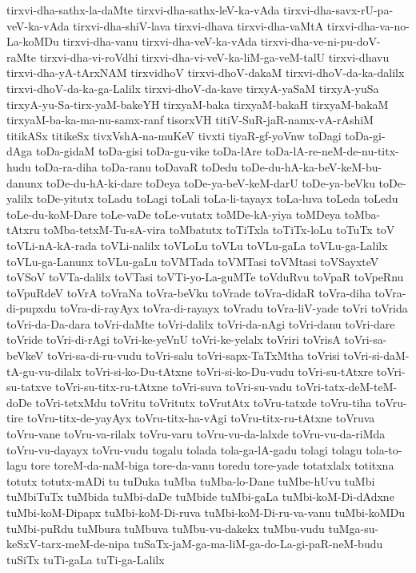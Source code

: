 {tirxvi-dha-sathx-la-daMte
tirxvi-dha-sathx-leV-ka-vAda
tirxvi-dha-savx-rU-pa-veV-ka-vAda
tirxvi-dha-shiV-lava
tirxvi-dhava
tirxvi-dha-vaMtA
tirxvi-dha-va-no-La-koMDu
tirxvi-dha-vanu
tirxvi-dha-veV-ka-vAda
tirxvi-dha-ve-ni-pu-doV-raMte
tirxvi-dha-vi-roVdhi
tirxvi-dha-vi-veV-ka-liM-ga-veM-talU
tirxvi-dhavu
tirxvi-dha-yA-tArxNAM
tirxvidhoV
tirxvi-dhoV-dakaM
tirxvi-dhoV-da-ka-dalilx
tirxvi-dhoV-da-ka-ga-Lalilx
tirxvi-dhoV-da-kave
tirxyA-yaSaM
tirxyA-yuSa
tirxyA-yu-Sa-tirx-yaM-bakeYH
tirxyaM-baka
tirxyaM-bakaH
tirxyaM-bakaM
tirxyaM-ba-ka-ma-nu-samx-ranf
tisorxVH
titiV-SuR-jaR-namx-vA-rAshiM
titikASx
titikeSx
tivxVshA-na-muKeV
tivxti
tiyaR-gf-yoVnw
toDagi
toDa-gi-dAga
toDa-gidaM
toDa-gisi
toDa-gu-vike
toDa-lAre
toDa-lA-re-neM-de-nu-titx-hudu
toDa-ra-diha
toDa-ranu
toDavaR
toDedu
toDe-du-hA-ka-beV-keM-bu-danunx
toDe-du-hA-ki-dare
toDeya
toDe-ya-beV-keM-darU
toDe-ya-beVku
toDe-yalilx
toDe-yitutx
toLadu
toLagi
toLali
toLa-li-tayayx
toLa-luva
toLeda
toLedu
toLe-du-koM-Dare
toLe-vaDe
toLe-vutatx
toMDe-kA-yiya
toMDeya
toMba-tAtxru
toMba-tetxM-Tu-sA-vira
toMbatutx
toTiTxla
toTiTx-loLu
toTuTx
toV
toVLi-nA-kA-rada
toVLi-nalilx
toVLoLu
toVLu
toVLu-gaLa
toVLu-ga-Lalilx
toVLu-ga-Lanunx
toVLu-gaLu
toVMTada
toVMTasi
toVMtasi
toVSayxteV
toVSoV
toVTa-dalilx
toVTasi
toVTi-yo-La-guMTe
toVduRvu
toVpaR
toVpeRnu
toVpuRdeV
toVrA
toVraNa
toVra-beVku
toVrade
toVra-didaR
toVra-diha
toVra-di-pupxdu
toVra-di-rayAyx
toVra-di-rayayx
toVradu
toVra-liV-yade
toVri
toVrida
toVri-da-Da-dara
toVri-daMte
toVri-dalilx
toVri-da-nAgi
toVri-danu
toVri-dare
toVride
toVri-di-rAgi
toVri-ke-yeVnU
toVri-ke-yelalx
toVriri
toVrisA
toVri-sa-beVkeV
toVri-sa-di-ru-vudu
toVri-salu
toVri-sapx-TaTxMtha
toVrisi
toVri-si-daM-tA-gu-vu-dilalx
toVri-si-ko-Du-tAtxne
toVri-si-ko-Du-vudu
toVri-su-tAtxre
toVri-su-tatxve
toVri-su-titx-ru-tAtxne
toVri-suva
toVri-su-vadu
toVri-tatx-deM-teM-doDe
toVri-tetxMdu
toVritu
toVritutx
toVrutAtx
toVru-tatxde
toVru-tiha
toVru-tire
toVru-titx-de-yayAyx
toVru-titx-ha-vAgi
toVru-titx-ru-tAtxne
toVruva
toVru-vane
toVru-va-rilalx
toVru-varu
toVru-vu-da-lalxde
toVru-vu-da-riMda
toVru-vu-dayayx
toVru-vudu
togalu
tolada
tola-ga-lA-gadu
tolagi
tolagu
tola-to-lagu
tore
toreM-da-naM-biga
tore-da-vanu
toredu
tore-yade
totatxlalx
totitxna
totutx
totutx-mADi
tu
tuDuka
tuMba
tuMba-lo-Dane
tuMbe-hUvu
tuMbi
tuMbiTuTx
tuMbida
tuMbi-daDe
tuMbide
tuMbi-gaLa
tuMbi-koM-Di-dAdxne
tuMbi-koM-Dipapx
tuMbi-koM-Di-ruva
tuMbi-koM-Di-ru-va-vanu
tuMbi-koMDu
tuMbi-puRdu
tuMbura
tuMbuva
tuMbu-vu-dakekx
tuMbu-vudu
tuMga-su-keSxV-tarx-meM-de-nipa
tuSaTx-jaM-ga-ma-liM-ga-do-La-gi-paR-neM-budu
tuSiTx
tuTi-gaLa
tuTi-ga-Lalilx
}
